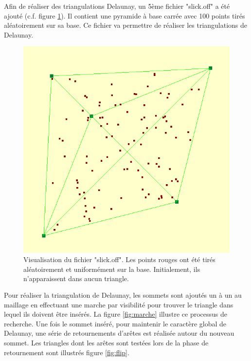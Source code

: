 \documentclass[12pt,a4paper,twoside]{report}
\begin{document}
Afin de réaliser des triangulations Delaunay, un 5ème fichier "slick.off" a été ajouté (c.f. figure \ref{fig:slick}). Il contient une pyramide à base carrée avec 100 points tirés aléatoirement sur sa base. Ce fichier va permettre de réaliser les triangulations de Delaunay.

\begin{figure}[H]
	\centering
	\includegraphics[scale=0.5]{slick.png}
	\caption{Visualisation du fichier "slick.off". Les points rouges ont été tirés aléatoirement et uniformément sur la base. Initialement, ils n'apparaissent dans aucun triangle.}
	\label{fig:slick}
\end{figure}

Pour réaliser la triangulation de Delaunay, les sommets sont ajoutés un à un au maillage en effectuant une marche par visibilité pour trouver le triangle dans lequel ils doivent être insérés. La figure \ref{fig:marche} illustre ce processus de recherche. Une fois le sommet inséré, pour maintenir le caractère global de Delaunay, une série de retournements d'arêtes est réalisée autour du nouveau sommet. Les triangles dont les arêtes sont testées lors de la phase de retournement sont illustrés figure \ref{fig:flip}.
\end{document}
